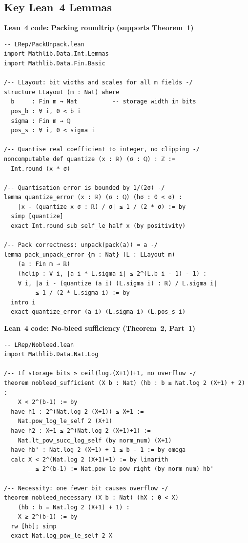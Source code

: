 \documentclass[11pt,a4paper]{article}
\theoremstyle{definition}
\theoremstyle{plain}
\theoremstyle{remark}
\begin{document}
\subsection{Key Lean~4 Lemmas}

\begin{leanblock}
\textbf{Lean~4 code: Packing roundtrip (supports Theorem~1)}
\begin{lstlisting}[language={}]
-- LRep/PackUnpack.lean
import Mathlib.Data.Int.Lemmas
import Mathlib.Data.Fin.Basic

/-- LLayout: bit widths and scales for all m fields -/
structure LLayout (m : Nat) where
  b     : Fin m → Nat          -- storage width in bits
  pos_b : ∀ i, 0 < b i
  sigma : Fin m → ℚ
  pos_s : ∀ i, 0 < sigma i

/-- Quantise real coefficient to integer, no clipping -/
noncomputable def quantize (x : ℝ) (σ : ℚ) : ℤ :=
  Int.round (x * σ)

/-- Quantisation error is bounded by 1/(2σ) -/
lemma quantize_error (x : ℝ) (σ : ℚ) (hσ : 0 < σ) :
    |x - (quantize x σ : ℝ) / σ| ≤ 1 / (2 * σ) := by
  simp [quantize]
  exact Int.round_sub_self_le_half x (by positivity)

/-- Pack correctness: unpack(pack(a)) ≈ a -/
lemma pack_unpack_error {m : Nat} (L : LLayout m)
    (a : Fin m → ℝ)
    (hclip : ∀ i, |a i * L.sigma i| ≤ 2^(L.b i - 1) - 1) :
    ∀ i, |a i - (quantize (a i) (L.sigma i) : ℝ) / L.sigma i|
         ≤ 1 / (2 * L.sigma i) := by
  intro i
  exact quantize_error (a i) (L.sigma i) (L.pos_s i)
\end{lstlisting}
\end{leanblock}

\begin{leanblock}
\textbf{Lean~4 code: No-bleed sufficiency (Theorem~2, Part~1)}
\begin{lstlisting}[language={}]
-- LRep/Nobleed.lean
import Mathlib.Data.Nat.Log

/-- If storage bits ≥ ceil(log₂(X+1))+1, no overflow -/
theorem nobleed_sufficient (X b : Nat) (hb : b ≥ Nat.log 2 (X+1) + 2) :
    X < 2^(b-1) := by
  have h1 : 2^(Nat.log 2 (X+1)) ≤ X+1 :=
    Nat.pow_log_le_self 2 (X+1)
  have h2 : X+1 ≤ 2^(Nat.log 2 (X+1)+1) :=
    Nat.lt_pow_succ_log_self (by norm_num) (X+1)
  have hb' : Nat.log 2 (X+1) + 1 ≤ b - 1 := by omega
  calc X < 2^(Nat.log 2 (X+1)+1) := by linarith
       _ ≤ 2^(b-1) := Nat.pow_le_pow_right (by norm_num) hb'

/-- Necessity: one fewer bit causes overflow -/
theorem nobleed_necessary (X b : Nat) (hX : 0 < X)
    (hb : b = Nat.log 2 (X+1) + 1) :
    X ≥ 2^(b-1) := by
  rw [hb]; simp
  exact Nat.log_pow_le_self 2 X
\end{lstlisting}
\end{leanblock}
\end{document}
